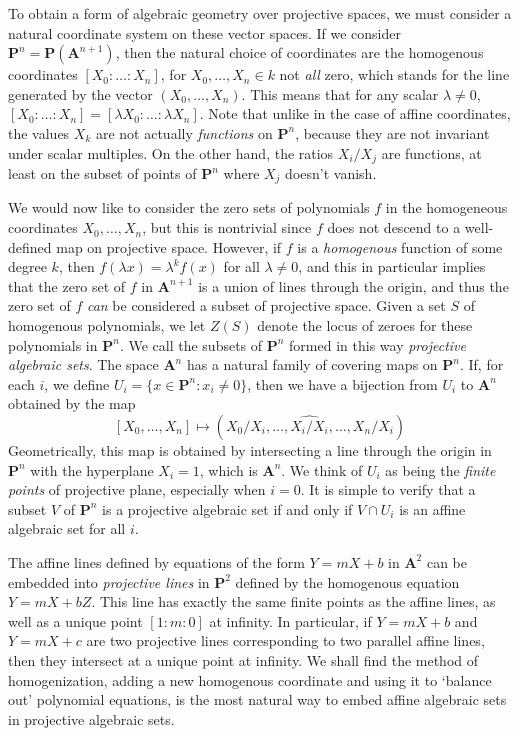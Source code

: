 To obtain a form of algebraic geometry over projective spaces, we must consider a natural coordinate system on these vector spaces. If we consider $\mathbf{P}^n = \mathbf{P}(\mathbf{A}^{n+1})$, then the natural choice of coordinates are the homogenous coordinates $[X_0: \dots: X_n]$, for $X_0, \dots, X_n \in k$ not {\it all} zero, which stands for the line generated by the vector $(X_0,\dots,X_n)$. This means that for any scalar $\lambda \neq 0$, $[X_0:\dots:X_n] = [\lambda X_0: \dots : \lambda X_n]$. Note that unlike in the case of affine coordinates, the values $X_k$ are not actually {\it functions} on $\mathbf{P}^n$, because they are not invariant under scalar multiples. On the other hand, the ratios $X_i/X_j$ are functions, at least on the subset of points of $\mathbf{P}^n$ where $X_j$ doesn't vanish.

We would now like to consider the zero sets of polynomials $f$ in the homogeneous coordinates $X_0,\dots,X_n$, but this is nontrivial since $f$ does not descend to a well-defined map on projective space. However, if $f$ is a {\it homogenous} function of some degree $k$, then $f(\lambda x) = \lambda^k f(x)$ for all $\lambda \neq 0$, and this in particular implies that the zero set of $f$ in $\mathbf{A}^{n+1}$ is a union of lines through the origin, and thus the zero set of $f$ \emph{can} be considered a subset of projective space. Given a set $S$ of homogenous polynomials, we let $Z(S)$ denote the locus of zeroes for these polynomials in $\mathbf{P}^n$. We call the subsets of $\mathbf{P}^n$ formed in this way \emph{projective algebraic sets}. The space $\mathbf{A}^n$ has a natural family of covering maps on $\mathbf{P}^n$. If, for each $i$, we define $U_i = \{ x \in \mathbf{P}^n: x_i \neq 0 \}$, then we have a bijection from $U_i$ to $\mathbf{A}^n$ obtained by the map
%
\[ [X_0, \dots, X_n] \mapsto (X_0/X_i, \dots, \widehat{X_i/X_i} ,\dots, X_n/X_i) \]
%
Geometrically, this map is obtained by intersecting a line through the origin in $\mathbf{P}^n$ with the hyperplane $X_i = 1$, which is $\mathbf{A}^n$. We think of $U_i$ as being the {\it finite points} of projective plane, especially when $i = 0$. It is simple to verify that a subset $V$ of $\mathbf{P}^n$ is a projective algebraic set if and only if $V \cap U_i$ is an affine algebraic set for all $i$.

\begin{example}
    The affine lines defined by equations of the form $Y = mX + b$ in $\mathbf{A}^2$ can be embedded into \emph{projective lines} in $\mathbf{P}^2$ defined by the homogenous equation $Y = mX + bZ$. This line has exactly the same finite points as the affine lines, as well as a unique point $[1:m:0]$ at infinity. In particular, if $Y = mX + b$ and $Y = mX + c$ are two projective lines corresponding to two parallel affine lines, then they intersect at a unique point at infinity. We shall find the method of homogenization, adding a new homogenous coordinate and using it to `balance out' polynomial equations, is the most natural way to embed affine algebraic sets in projective algebraic sets.
\end{example}

